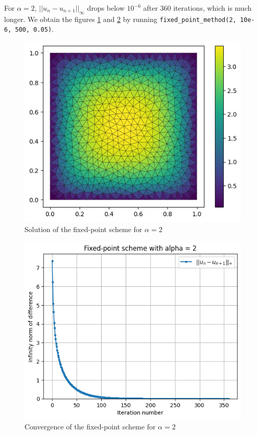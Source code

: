 \documentclass[11pt, a4paper, twoside]{article}
\begin{document}
 For $\alpha=2$, $||u_n -u_{n+1}||_\infty$  drops below $10^{-6}$ after 360 iterations, which is much longer. We obtain the figures \ref{q2fig3} and \ref{q2fig4} by running \verb+fixed_point_method(2, 10e-6, 500, 0.05)+.
 
 \begin{figure}[H]
\centering
\includegraphics[scale = 0.7]{../Figures/fixed_sol_alpha2.png}
\caption{Solution of the fixed-point scheme for $\alpha=2$}
\label{q2fig3}
\end{figure}

\begin{figure}[H]
\centering
\includegraphics[scale = 0.7]{../Figures/fixed_conv_alpha2.png}
\caption{Convergence of the fixed-point scheme for $\alpha=2$}
\label{q2fig4}
\end{figure}
\end{document}
